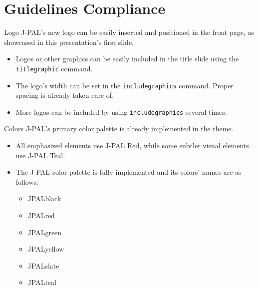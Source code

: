 \documentclass{beamer}
\begin{document}
\section{Guidelines Compliance}
\begin{frame}{Logo}
	\alert{J-PAL's new logo} can be easily inserted and positioned in the front page, as showcased in this presentation's first slide.
	\begin{itemize}
		\item Logos or other graphics can be easily included in the title slide using the \texttt{titlegraphic} command.
		\item The logo's width can be set in the \texttt{includegraphics} command. Proper spacing is already taken care of.
		\item More logos can be included by using \texttt{includegraphics} several times.
	\end{itemize}
\end{frame}

\begin{frame}{Colors}
	\alert{J-PAL's primary color palette} is already implemented in the theme.
	\begin{itemize}
		\item  All emphasized elements use \alert{J-PAL Red}, while some subtler visual elements use \textcolor{JPALteal}{J-PAL Teal}.
		\item The J-PAL color palette is fully implemented and its colors' names are as follows:
			\begin{itemize}
			\item \textcolor{JPALblack}{JPALblack}
			\item \textcolor{JPALred}{JPALred}
			\item \textcolor{JPALgreen}{JPALgreen}
			\item \textcolor{JPALyellow}{JPALyellow}
			\item \textcolor{JPALslate}{JPALslate}
			\item \textcolor{JPALteal}{JPALteal}
			\end{itemize}
	\end{itemize}
\end{frame}
\end{document}
